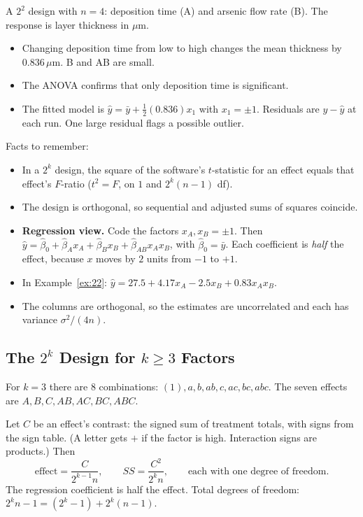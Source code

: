 \begin{example}
A $2^2$ design with $n=4$: deposition time (A) and arsenic flow rate (B). The response is layer thickness in $\mu$m.
\begin{itemize}
  \item Changing deposition time from low to high changes the mean thickness by $0.836\,\mu$m. B and AB are small.
  \item The ANOVA confirms that only deposition time is significant.
  \item The fitted model is $\hat{y}=\bar{y}+\tfrac12(0.836)x_1$ with $x_1=\pm1$. Residuals are $y-\hat{y}$ at each run. One large residual flags a possible outlier.
\end{itemize}
\end{example}

Facts to remember:
\begin{itemize}
  \item In a $2^k$ design, the square of the software's $t$-statistic for an effect equals that effect's $F$-ratio ($t^2=F$, on $1$ and $2^k(n-1)$ df).
  \item The design is orthogonal, so sequential and adjusted sums of squares coincide.
  \item \textbf{Regression view.} Code the factors $x_A,x_B=\pm1$. Then $\hat{y}=\hat\beta_0+\hat\beta_Ax_A+\hat\beta_Bx_B+\hat\beta_{AB}x_Ax_B$, with $\hat\beta_0=\bar{y}$. Each coefficient is \emph{half} the effect, because $x$ moves by $2$ units from $-1$ to $+1$.
  \item In Example~\ref{ex:22}: $\hat{y}=27.5+4.17x_A-2.5x_B+0.83x_Ax_B$.
  \item The columns are orthogonal, so the estimates are uncorrelated and each has variance $\sigma^2/(4n)$.
\end{itemize}

\subsection{The $2^k$ Design for $k\ge3$ Factors}

For $k=3$ there are $8$ combinations: $(1),a,b,ab,c,ac,bc,abc$. The seven effects are $A,B,C,AB,AC,BC,ABC$.

\begin{theorem}\label{thm:2k}
Let $C$ be an effect's contrast: the signed sum of treatment totals, with signs from the sign table. (A letter gets $+$ if the factor is high. Interaction signs are products.) Then
\[ \text{effect}=\frac{C}{2^{k-1}n},\qquad SS=\frac{C^2}{2^kn},\qquad\text{each with one degree of freedom.} \]
The regression coefficient is half the effect. Total degrees of freedom: $2^kn-1=(2^k-1)+2^k(n-1)$.
\end{theorem}

